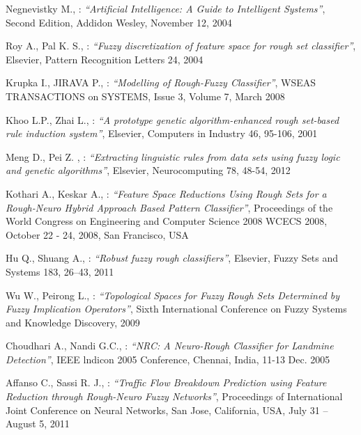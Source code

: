 

\begin{thebibliography}{99}

	Negnevistky M.,  : \textit{``Artificial Intelligence: A Guide to
    Intelligent Systems''}, Second Edition, Addidon Wesley, November 12, 2004

	Roy A., Pal K. S., : \textit{``Fuzzy discretization of feature space for rough
	set classifier''}, Elsevier, Pattern Recognition Letters 24, 2004

	Krupka I., JIRAVA P., : \textit{``Modelling of Rough-Fuzzy Classifier''}, WSEAS
	TRANSACTIONS on SYSTEMS, Issue 3, Volume 7, March 2008

	Khoo L.P., Zhai L., : \textit{``A prototype genetic algorithm-enhanced rough
	set-based rule induction system''}, Elsevier, Computers in Industry 46, 95-106, 2001

	Meng D., Pei Z. , : \textit{``Extracting linguistic rules from data sets using fuzzy logic and
	genetic algorithms''}, Elsevier, Neurocomputing 78, 48-54, 2012

	Kothari A., Keskar A., : \textit{``Feature Space Reductions Using Rough Sets for a Rough-Neuro Hybrid Approach Based Pattern
	Classifier''}, Proceedings of the World Congress on Engineering and Computer Science 2008 WCECS 2008, October 22 - 24, 2008, 
	San Francisco, USA

	Hu Q., Shuang A., : \textit{``Robust fuzzy rough classifiers''}, Elsevier, Fuzzy Sets and Systems 183, 26–43, 2011

	Wu W., Peirong L., : \textit{``Topological Spaces for Fuzzy Rough Sets Determined by Fuzzy Implication
	Operators''}, Sixth International Conference on Fuzzy Systems and Knowledge Discovery, 2009

	Choudhari A., Nandi G.C., : \textit{``NRC: A Neuro-Rough Classifier for Landmine
	Detection''}, IEEE lndicon 2005 Conference, Chennai, India, 11-13 Dec. 2005
	
	Affanso C., Sassi R. J., : \textit{``Traffic Flow Breakdown Prediction using Feature
	Reduction through Rough-Neuro Fuzzy Networks''}, Proceedings of International Joint Conference on Neural Networks, 
	San Jose, California, USA, July 31 – August 5, 2011


\end{thebibliography}
